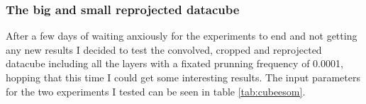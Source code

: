 \documentclass[11pt,fleqn]{book} %
\begin{document}
																																																																																																																																																																																																																																																																												\subsubsection{The big and small reprojected datacube}
																																																																																																																																																																																																																																																																												After a few days of waiting anxiously for the experiments to end and not getting any new results I decided to test the convolved, cropped and reprojected datacube including all the layers with a fixated prunning frequency of 0.0001, hopping that this time I could get some interesting results. The input parameters for the two experiments I tested can be seen in table \ref{tab:cubeesom}.
\end{document}
